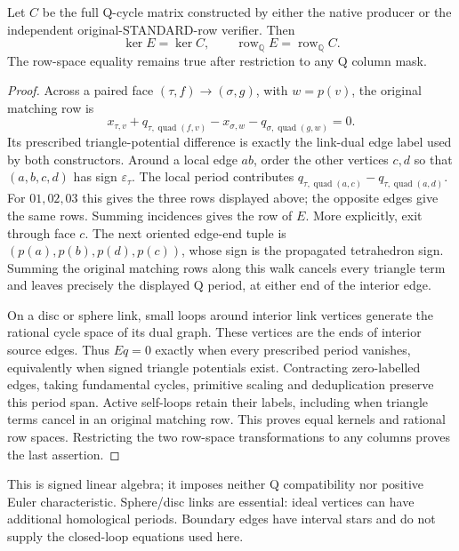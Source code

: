 \begin{proposition}
Let $C$ be the full Q-cycle matrix constructed by either the native producer
or the independent original-STANDARD-row verifier.  Then
\[
 \ker E=\ker C,\qquad
 \operatorname{row}_{\mathbb Q}E=\operatorname{row}_{\mathbb Q}C.
\]
The row-space equality remains true after restriction to any Q column mask.
\end{proposition}
\begin{proof}
Across a paired face $(\tau,f)\to(\sigma,g)$, with $w=p(v)$, the original
matching row is
\[
 x_{\tau,v}+q_{\tau,\operatorname{quad}(f,v)}
   -x_{\sigma,w}-q_{\sigma,\operatorname{quad}(g,w)}=0.
\]
Its prescribed triangle-potential difference is exactly the link-dual edge
label used by both constructors.  Around a local edge $ab$, order the other
vertices $c,d$ so that $(a,b,c,d)$ has sign $\varepsilon_\tau$.
The local period contributes
$q_{\tau,\operatorname{quad}(a,c)}-q_{\tau,\operatorname{quad}(a,d)}$.
For $01,02,03$ this gives the three rows displayed above; the opposite
edges give the same rows.  Summing incidences gives the row of $E$.
More explicitly, exit through face $c$.  The next oriented edge-end tuple
is $(p(a),p(b),p(d),p(c))$, whose sign is the propagated tetrahedron sign.
Summing the original matching rows along this walk cancels every triangle
term and leaves precisely the displayed Q period, at either end of the
interior edge.

On a disc or sphere link, small loops around interior link vertices generate
the rational cycle space of its dual graph.  These vertices are the ends of
interior source edges.  Thus $Eq=0$ exactly when every prescribed period
vanishes, equivalently when signed triangle potentials exist.  Contracting
zero-labelled edges, taking fundamental cycles, primitive scaling and
deduplication preserve this period span.  Active self-loops retain their
labels, including when triangle terms cancel in an original matching row.
This proves equal kernels and rational row spaces.  Restricting the two
row-space transformations to any columns proves the last assertion.
\end{proof}

This is signed linear algebra; it imposes neither Q compatibility nor
positive Euler characteristic.  Sphere/disc links are essential: ideal
vertices can have additional homological periods.  Boundary edges have
interval stars and do not supply the closed-loop equations used here.

